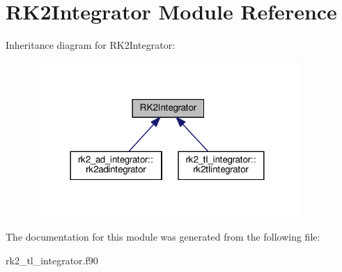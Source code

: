 \hypertarget{classRK2Integrator}{}\section{R\+K2\+Integrator Module Reference}
\label{classRK2Integrator}


Inheritance diagram for R\+K2\+Integrator\+:\nopagebreak
\begin{figure}[H]
\begin{center}
\leavevmode
\includegraphics[width=288pt]{classRK2Integrator__inherit__graph}
\end{center}
\end{figure}


The documentation for this module was generated from the following file\+:\begin{DoxyCompactItemize}
\item 
rk2\+\_\+tl\+\_\+integrator.\+f90\end{DoxyCompactItemize}
